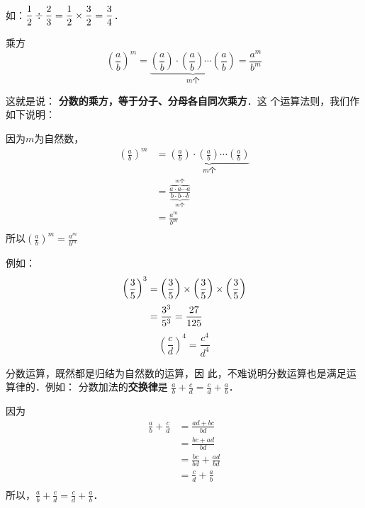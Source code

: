如：$\dfrac{1}{2}\div\dfrac{2}{3}=\dfrac{1}{2}\times \dfrac{3}{2}=\dfrac{3}{4}$．

\begin{blk}{乘方}
    \[\left(\frac{a}{b}\right)^m=\underbrace{\left(\frac{a}{b}\right)\cdot \left(\frac{a}{b}\right)\cdots \left(\frac{a}{b}\right)}_{\text{$m$个}}=\frac{a^m}{b^m}\]
\end{blk}

这就是说：
\textbf{分数的乘方，等于分子、分母各自同次乘方}．这
个运算法则，我们作如下说明：

\begin{note}
    因为$m$为自然数，
\begin{align*}
    \left(\frac{a}{b}\right)^m&=\underbrace{\left(\frac{a}{b}\right)\cdot \left(\frac{a}{b}\right)\cdots \left(\frac{a}{b}\right)}_{\text{$m$个}}
 \tag{乘方的意义}\\
&=\frac{\overbrace{a\cdot a\cdots a}^{\text{$m$个}}}{\underbrace{b\cdot b\cdots b}_{\text{$m$个}}} \tag{分数乘法法则}\\
&= \frac{a^m}{b^m}\tag{乘方的意义}\\
\end{align*}
所以$\left(\frac{a}{b}\right)^m=\frac{a^m}{b^m}$
\end{note}

例如：
\[ \begin{split}
    \left(\dfrac{3}{5}\right)^3&=\left(\dfrac{3}{5}\right)\times \left(\dfrac{3}{5}\right)\times \left(\dfrac{3}{5}\right)\\
    &=\dfrac{3^3}{5^3}=\dfrac{27}{125}
\end{split} \]
\[ \left(\frac{c}{d}\right)^4=\frac{c^4}{d^4} \]

分数运算，既然都是归结为自然数的运算，因
此，不难说明分数运算也是满足运算律的．例如：
分数加法的\textbf{交换律}是
$\frac{a}{b}+\frac{c}{d}=\frac{c}{d}+\frac{a}{b}$．

\begin{note}
    因为
    \begin{align*}
        \frac{a}{b}+\frac{c}{d}&=\frac{ad+bc}{bd} \tag{分数加法法则}\\
        &=\frac{bc+ad}{bd}\tag{自然数加法交换律}\\
        &=\frac{bc}{bd}+\frac{ad}{bd}\\
        &=\frac{c}{d}+\frac{a}{b}\tag{分数的基本性质}\\
    \end{align*}
    所以，$\frac{a}{b}+\frac{c}{d}=\frac{c}{d}+\frac{a}{b}$．
\end{note}

